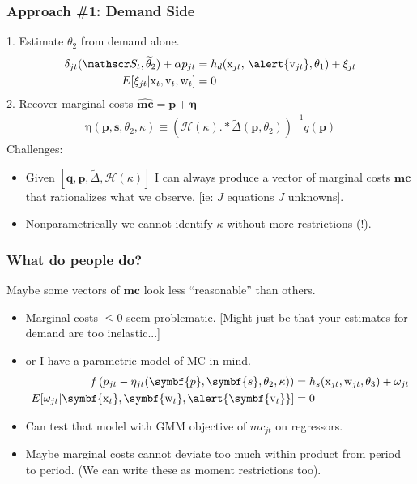 \documentclass[aspectratio=169,10pt]{beamer}
\begin{document}
\begin{frame}
\frametitle{Approach \#1: Demand Side}
1. Estimate $\theta_2$ from demand alone.
\begin{align*}
\delta_{jt}(\calS_t,\widetilde{\theta}_2) + \alpha p_{jt} &= h_d(\textrm{x}_{jt}, \, \alert{\textrm{v}_{jt}},\theta_1)  + \xi_{jt} \\
E[\xi_{jt} | \textrm{x}_{t}, \textrm{v}_{t}, \textrm{w}_{t}] &=0
\end{align*}
2. Recover marginal costs $\widehat{\symbf{mc}} = \symbf{p} + \symbf{\eta}$
\begin{align*}
\symbf{\eta}(\symbf{p},\symbf{s},\theta_2,\kappa) \equiv \left(\mathcal{H}(\kappa).*\tilde{\Delta}(\symbf{p},\theta_2) \right)^{-1} q(\symbf{p})
\end{align*}
\vspace{-0.2cm}
Challenges:
\begin{itemize}
\item Given $[\symbf{q},\symbf{p},\tilde{\Delta},\mathcal{H}(\kappa)]$ I can always produce a vector of marginal costs $\symbf{mc}$ that rationalizes what we observe. [ie: $J$ equations $J$ unknowns].
\item Nonparametrically we cannot identify $\kappa$ without more restrictions (!).
\end{itemize}
\end{frame}



\begin{frame}\frametitle{What do people do?}
Maybe some vectors of $\symbf{mc}$ look less ``reasonable'' than others.
\begin{itemize}
\item Marginal costs $\leq 0$ seem problematic.
[Might just be that your estimates for demand are too inelastic...]
\item or I have a parametric model of MC in mind. 
\begin{align*}
 f \left( p_{jt} - \eta_{jt}(\symbf{p},\symbf{s},\theta_2,\kappa) \right) &= h_s(\textrm{x}_{jt}, \textrm{w}_{jt},\theta_3) + \omega_{jt}\\
 E[\omega_{jt} | \symbf{\textrm{x}_{t}}, \symbf{\textrm{w}_{t}}, \alert{\symbf{\textrm{v}_{t}}}]&=0
\end{align*}
\item Can test that model with GMM objective of $mc_{jt}$ on regressors.
\item Maybe marginal costs cannot deviate too much within product from period to period. (We can write these as moment restrictions too).
\end{itemize}
\end{frame}
\end{document}
